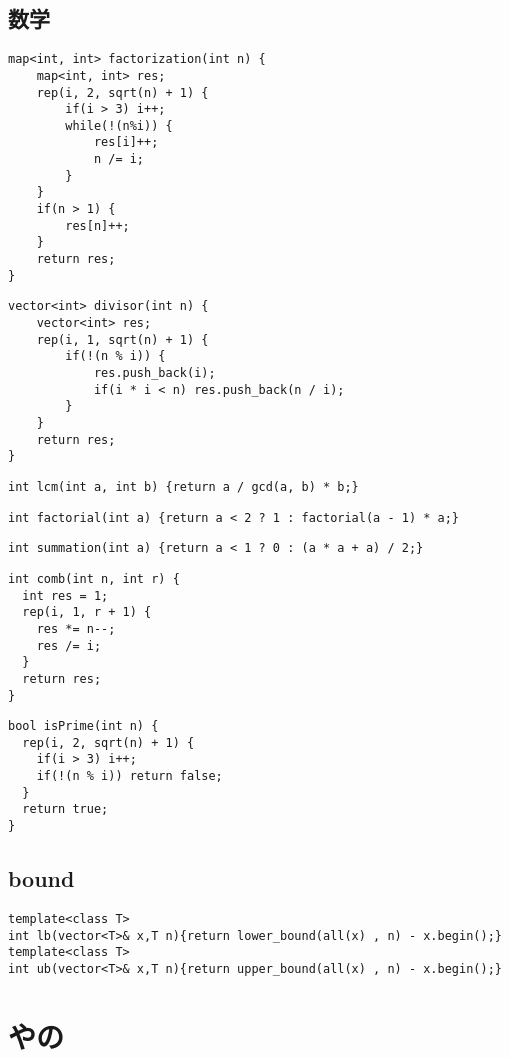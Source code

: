 \documentclass{jsarticle}
\begin{document}
\subsection*{数学}
\begin{lstlisting}[caption=素因数分解]
map<int, int> factorization(int n) {
    map<int, int> res;
    rep(i, 2, sqrt(n) + 1) {
        if(i > 3) i++;
        while(!(n%i)) {
            res[i]++;
            n /= i;
        }
    }
    if(n > 1) {
        res[n]++;
    }
    return res;
}
\end{lstlisting}
\begin{lstlisting}[caption=約数列挙]
vector<int> divisor(int n) {
    vector<int> res;
    rep(i, 1, sqrt(n) + 1) {
        if(!(n % i)) {
            res.push_back(i);
            if(i * i < n) res.push_back(n / i);
        }
    }
    return res;
}
\end{lstlisting}
\begin{lstlisting}[caption=最小公倍数]
int lcm(int a, int b) {return a / gcd(a, b) * b;}
\end{lstlisting}
\begin{lstlisting}[caption=累乗]
int factorial(int a) {return a < 2 ? 1 : factorial(a - 1) * a;}
\end{lstlisting}
\begin{lstlisting}[caption=総和]
int summation(int a) {return a < 1 ? 0 : (a * a + a) / 2;}
\end{lstlisting}
\begin{lstlisting}[caption=組み合わせ]
int comb(int n, int r) {
  int res = 1;
  rep(i, 1, r + 1) {
    res *= n--;
    res /= i;
  }
  return res;
}
\end{lstlisting}
\begin{lstlisting}[caption=素数判定]
bool isPrime(int n) {
  rep(i, 2, sqrt(n) + 1) {
    if(i > 3) i++;
    if(!(n % i)) return false;
  }
  return true;
}
\end{lstlisting}

\subsection*{bound}
\begin{lstlisting}[caption=bound]
template<class T>
int lb(vector<T>& x,T n){return lower_bound(all(x) , n) - x.begin();}
template<class T>
int ub(vector<T>& x,T n){return upper_bound(all(x) , n) - x.begin();}
\end{lstlisting}

\section*{やの}
\end{document}
